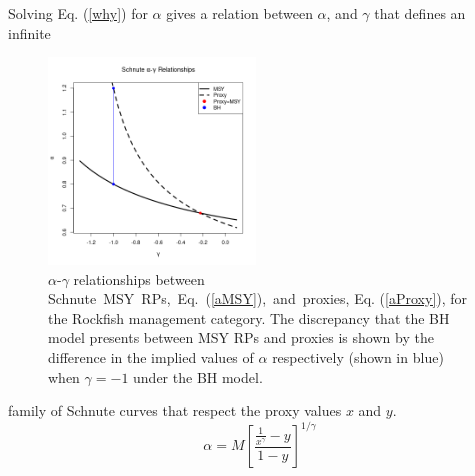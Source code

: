 Solving Eq. (\ref{why}) for $\alpha$ gives a relation between $\alpha$, 
and $\gamma$ that defines an infinite %
\begin{figure}
\vspace{-1cm}
\includegraphics[width=0.49\textwidth]{../gpBias/agRF_x0.5_y0.4.png}
\vspace{-1.5cm}
\caption{\label{agCurves} $\alpha$-$\gamma$ relationships between \mbox{Schnute MSY RPs, Eq. (\ref{aMSY}), and proxies,} Eq. (\ref{aProxy}), for the Rockfish management category.
The discrepancy that the BH model presents between MSY RPs and proxies is shown by the difference in the implied values of $\alpha$ respectively (shown in blue) when $\gamma=-1$ under the BH model.
}
\end{figure}
%
family of Schnute curves that respect the proxy values $x$ and $y$.
%
\begin{equation}
\alpha = M\left[ \frac{\frac{1}{x^\gamma}-y}{1-y} \right]^{1/\gamma} \label{aProxy} %
\end{equation}


